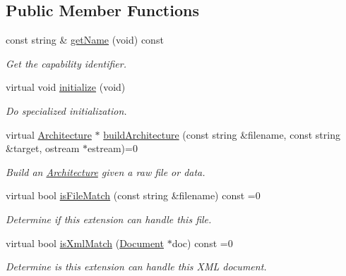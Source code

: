 \subsection*{Public Member Functions}
\begin{DoxyCompactItemize}
\item 
const string \& \mbox{\hyperlink{class_architecture_capability_ad8a6f6079fde87a12582a68bfeab73af}{get\+Name}} (void) const
\begin{DoxyCompactList}\small\item\em Get the capability identifier. \end{DoxyCompactList}\item 
virtual void \mbox{\hyperlink{class_architecture_capability_af414aa921939711c0199d02e2ff35e26}{initialize}} (void)
\begin{DoxyCompactList}\small\item\em Do specialized initialization. \end{DoxyCompactList}\item 
virtual \mbox{\hyperlink{class_architecture}{Architecture}} $\ast$ \mbox{\hyperlink{class_architecture_capability_a42e418206c4bcd9c0bc86d8ddfbf03e0}{build\+Architecture}} (const string \&filename, const string \&target, ostream $\ast$estream)=0
\begin{DoxyCompactList}\small\item\em Build an \mbox{\hyperlink{class_architecture}{Architecture}} given a raw file or data. \end{DoxyCompactList}\item 
virtual bool \mbox{\hyperlink{class_architecture_capability_aa3d4fed15e42f3e853851babaf379376}{is\+File\+Match}} (const string \&filename) const =0
\begin{DoxyCompactList}\small\item\em Determine if this extension can handle this file. \end{DoxyCompactList}\item 
virtual bool \mbox{\hyperlink{class_architecture_capability_a653243b342d480273e0f04f7194094b8}{is\+Xml\+Match}} (\mbox{\hyperlink{class_document}{Document}} $\ast$doc) const =0
\begin{DoxyCompactList}\small\item\em Determine is this extension can handle this X\+ML document. \end{DoxyCompactList}\end{DoxyCompactItemize}

